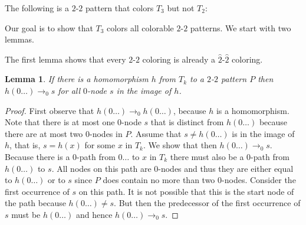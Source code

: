\documentclass[a4paper]{article}
\newtheorem{lemma}[theorem]{Lemma}
\begin{document}
The following is a $2$-$2$ pattern that colors $T_3$ but not $T_2$:
\begin{center}
\end{center}

Our goal is to show that $T_3$ colors all colorable $2$-$2$ patterns. We
start with two lemmas.

The first lemma shows that every $2$-$2$ coloring is already a
$\hat{2}$-$\hat{2}$ coloring.
\begin{lemma} \label{reachability lemma}
 If there is a homomorphism $h$ from $T_k$ to a $2$-$2$ pattern $P$ then
$h(0\dots) \rightarrow_0 s$ for all $0$-node $s$ in the image of $h$.
\end{lemma}
\begin{proof}
 First observe that $h(0\dots) \rightarrow_0 h(0\dots)$, because $h$ is
a homomorphism. Note that there is at most one $0$-node $s$ that is
distinct from $h(0\dots)$ because there are at most two $0$-nodes in
$P$. Assume that $s \neq h(0\dots)$ is in the image of $h$, that is, $s
= h(x)$ for some $x$ in $T_k$. We show that then $h(0\dots)
\rightarrow_0 s$. Because there is a $0$-path from $0\dots$ to $x$ in
$T_k$ there must also be a $0$-path from $h(0\dots)$ to $s$. All nodes
on this path are $0$-nodes and thus they are either equal to $h(0\dots)$
or to $s$ since $P$ does contain no more than two $0$-nodes. Consider
the first occurrence of $s$ on this path. It is not possible that this is
the start node of the path because $h(0\dots) \neq s$. But then the
predecessor of the first occurrence of $s$ must be $h(0\dots)$ and hence
$h(0\dots) \rightarrow_0 s$.
\end{proof}
\end{document}
